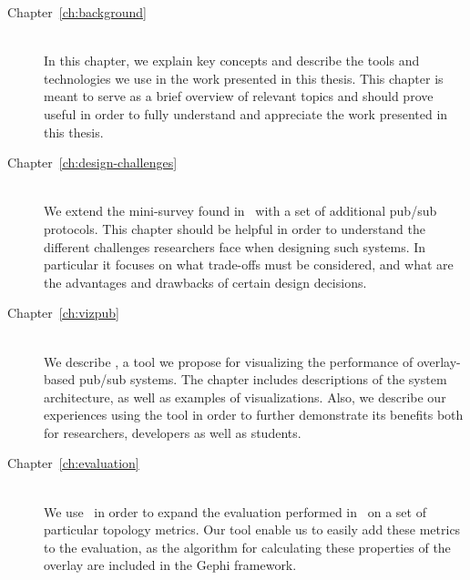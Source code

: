 \begin{description}
    \item[Chapter~\ref{ch:background}] \hfill \\

        In this chapter, we explain key concepts and describe the tools
        and technologies we use in the work presented in this thesis.
        This chapter is meant to serve as a brief overview of relevant
        topics and should prove useful in order to fully understand and
        appreciate the work presented in this thesis.

    \item[Chapter~\ref{ch:design-challenges}] \hfill \\

        We extend the mini-survey found in~\cite{Setty:2012} with a set
        of additional pub/sub protocols. This chapter should be helpful
        in order to understand the different challenges researchers face
        when designing such systems. In particular it focuses on what
        trade-offs must be considered, and what are the advantages and
        drawbacks of certain design decisions.

    \item[Chapter~\ref{ch:vizpub}] \hfill \\

        We describe \demo, a tool we propose for visualizing the
        performance of overlay-based pub/sub systems. The chapter
        includes descriptions of the system architecture, as well as
        examples of visualizations. Also, we describe our experiences
        using the tool in order to further demonstrate its benefits both
        for researchers, developers as well as students.

    \item[Chapter~\ref{ch:evaluation}] \hfill \\

       We use \demo~in order to expand the evaluation performed
       in~\cite{Setty:2012} on a set of particular topology metrics. Our
       tool enable us to easily add these metrics to the evaluation, as
       the algorithm for calculating these properties of the overlay are
       included in the Gephi framework.



\end{description}

